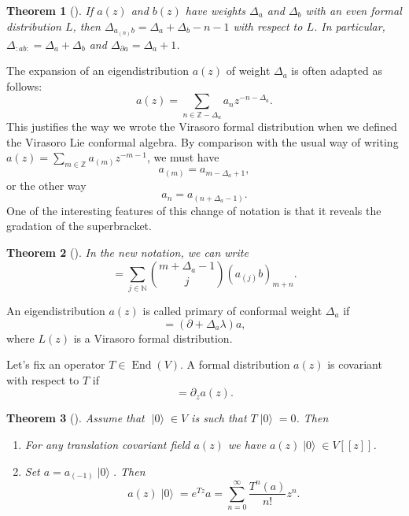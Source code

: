 \documentclass[a4paper, 12pt, reqno]{amsart}
\newtheorem{theorem}{Theorem}[subsection]
\theoremstyle{remark}
\numberwithin{equation}{subsection}
\DeclareMathOperator{\End}{End}
\DeclareMathOperator{\vac}{|0\rangle}
\begin{document}
\begin{theorem}[{\cite[Proposition 3.7.4]{nozaradan_introduction_2008}}]
  \label{thr:9}
  If $a(z)$ and $b(z)$ have weights $\Delta_a$ and $\Delta_b$ with an even formal distribution $L$, then $\Delta_{a_{(n)}b} = \Delta_a + \Delta_b - n - 1$ with respect to $L$.
  In particular, $\Delta_{:ab:} = \Delta_a + \Delta_b$ and $\Delta_{\partial a} = \Delta_a + 1$.
\end{theorem}

The expansion of an eigendistribution $a(z)$ of weight $\Delta_a$ is often adapted as follows:
\begin{equation*}
  a(z) = \sum_{n \in \mathbb{Z} - \Delta_a}a_nz^{-n - \Delta_a}.
\end{equation*}
This justifies the way we wrote the Virasoro formal distribution when we defined the Virasoro Lie conformal algebra.
By comparison with the usual way of writing $a(z) = \sum_{m \in \mathbb{Z}}a_{(m)}z^{-m - 1}$, we must have
\begin{equation*}
  a_{(m)} = a_{m - \Delta_a + 1},
\end{equation*}
or the other way
\begin{equation*}
  a_n = a_{(n + \Delta_a - 1)}.
\end{equation*}
One of the interesting features of this change of notation is that it reveals the gradation of the superbracket.

\begin{theorem}[{\cite[Proposition 3.7.6]{nozaradan_introduction_2008}}]
  \label{thr:10}
  In the new notation, we can write
  \begin{equation*}
    [a_m, b_n] = \sum_{j \in \mathbb{N}}\binom{m + \Delta_a - 1}{j}(a_{(j)}b)_{m + n}.
  \end{equation*}
\end{theorem}

An eigendistribution $a(z)$ is called primary of conformal weight $\Delta_a$ if
\begin{equation*}
  [L_\lambda a]=(\partial +\Delta_a\lambda)a,
\end{equation*}
where $L(z)$ is a Virasoro formal distribution.

Let's fix an operator $T\in \End(V)$.
A formal distribution $a(z)$ is covariant with respect to $T$ if
\begin{equation*}
  [T, a(z)] = \partial_za(z).
\end{equation*}

\begin{theorem}[{\cite[Lemma 1]{callegaro_introduction_2017}}]
  \label{thr:11}
  Assume that $\vac \in V$ is such that $T\vac = 0$.
  Then
  \begin{enumerate}
  \item For any translation covariant field $a(z)$ we have $a(z)\vac \in V[[z]]$.
  \item Set $a = a_{(-1)}\vac$.
    Then
    \begin{equation*}
      a(z)\vac = e^{Tz}a = \sum_{n = 0}^\infty\frac{T^n(a)}{n!}z^n.
    \end{equation*}
  \end{enumerate}
\end{theorem}
\end{document}
